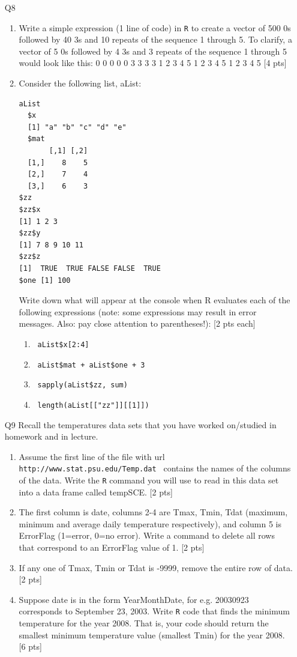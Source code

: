 \documentclass[12pt]{article}
\theoremstyle{Conjecture}
\theoremstyle{example}
\theoremstyle{remark}
\theoremstyle{lemma}
\theoremstyle{definition}
\theoremstyle{corol}
\theoremstyle{proposition}
\theoremstyle{condition}
\begin{document}
\begin{enumerate}
\newpage 
\item [Q8] \begin{enumerate} 
  \item Write a simple expression (1 line of code) in {\tt R} to
    create a vector of 500 0s followed by 40 3s and 10 repeats of the
    sequence 1 through 5. To clarify, a vector of 5 0s followed by 4
    3s and 3 repeats of the sequence 1 through 5 would look like this:
    0 0 0 0 0 3 3 3 3 1 2 3 4 5 1 2 3 4 5 1 2 3 4 5 [4 pts]
    \vspace{0.4in}
\item Consider the following list, aList:
\begin{verbatim}
aList
  $x
  [1] "a" "b" "c" "d" "e"
  $mat
       [,1] [,2]
  [1,]    8    5
  [2,]    7    4
  [3,]    6    3
$zz
$zz$x
[1] 1 2 3
$zz$y
[1] 7 8 9 10 11
$zz$z
[1]  TRUE  TRUE FALSE FALSE  TRUE
$one [1] 100
\end{verbatim}
Write down what will appear at the console when R evaluates each of 
the following expressions (note: some expressions may result in 
 error messages. Also: pay close attention to parentheses!): [2 pts each] 

\begin{enumerate}
\item \verb| aList$x[2:4] |
\vspace{0.2in}
\item \verb| aList$mat + aList$one + 3|
\vspace{0.2in}
\item \verb| sapply(aList$zz, sum)|
\vspace{0.2in}
\item \verb| length(aList[["zz"]][[1]])|
\end{enumerate}
\end{enumerate}

\newpage 
\item [Q9] Recall the temperatures data sets that you have worked on/studied in homework and in lecture. 
\begin{enumerate}
\item Assume the first line of the file with url
  \verb| http://www.stat.psu.edu/Temp.dat | contains the names of the
  columns of the data. Write the {\tt R} command you will use to read
  in this data set into a data frame called tempSCE. [2 pts]
\item The first column is date, columns 2-4 are Tmax, Tmin, Tdat
  (maximum, minimum and average daily temperature respectively), and
  column 5 is ErrorFlag (1=error, 0=no error). Write a command to
  delete all rows that correspond to an ErrorFlag value of 1. [2 pts]
\item If any one of Tmax, Tmin or Tdat is -9999, remove the entire row of data. [2 pts]
\item Suppose date is in the form YearMonthDate, for e.g. 20030923
  corresponds to September 23, 2003. Write {\tt R} code that finds the
  minimum temperature for the year 2008. That is, your code should
  return the smallest minimum temperature value (smallest Tmin) for
  the year 2008. [6 pts]
\end{enumerate}


\end{enumerate}
\end{document}

